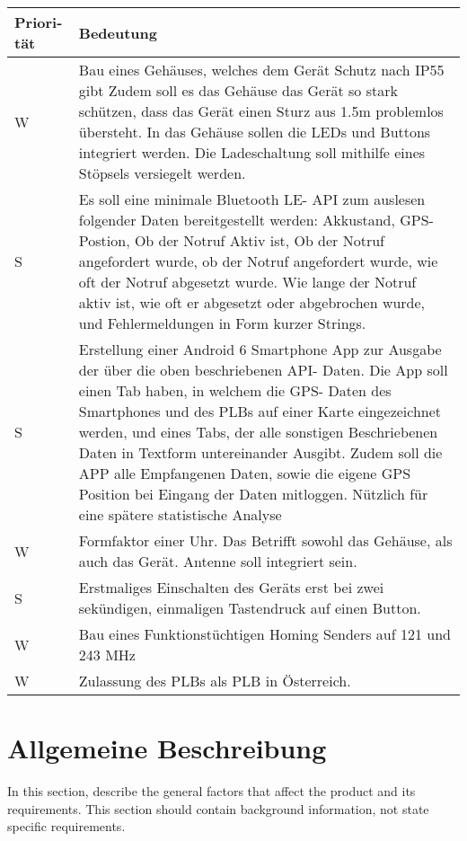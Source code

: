 \newpage
\begin{tabular}{| p{1.5cm} | p{13.5cm} |}
	
	\hline
	\textbf{Priori-} \newline \textbf{tät} & 
	\textbf{Bedeutung} \\
	\hline
	
	W & 
	Bau eines Gehäuses, welches dem Gerät Schutz nach IP55 gibt
	Zudem soll es das Gehäuse das Gerät so stark schützen, dass das Gerät einen Sturz aus 1.5m problemlos übersteht.
	In das Gehäuse sollen die LEDs und Buttons integriert werden. Die Ladeschaltung soll mithilfe eines Stöpsels versiegelt werden.\\
	\hline
	S &
	Es soll eine minimale Bluetooth LE- API zum auslesen folgender Daten bereitgestellt werden: Akkustand, GPS- Postion, Ob der Notruf Aktiv ist, Ob der Notruf angefordert wurde, ob der Notruf angefordert wurde, wie oft der Notruf abgesetzt wurde. Wie lange der Notruf aktiv ist, wie oft er abgesetzt oder abgebrochen wurde, und Fehlermeldungen in Form kurzer Strings.\\
	\hline
	S &
	Erstellung einer Android 6 Smartphone App zur Ausgabe der über die oben beschriebenen API- Daten. Die App soll einen Tab haben, in welchem die GPS- Daten des Smartphones und des PLBs auf einer Karte eingezeichnet werden, und eines Tabs, der alle sonstigen Beschriebenen Daten in Textform untereinander Ausgibt. Zudem soll die APP alle Empfangenen Daten, sowie die eigene GPS Position bei Eingang der Daten mitloggen. Nützlich für eine spätere statistische Analyse\\
	\hline
	
	W & 
	Formfaktor einer Uhr. Das Betrifft sowohl das Gehäuse, als auch das Gerät. Antenne soll integriert sein.\\
	\hline
	
	S &
	Erstmaliges Einschalten des Geräts erst bei zwei sekündigen, einmaligen Tastendruck auf einen Button.\\
	\hline
	
	W & 
	Bau eines Funktionstüchtigen Homing Senders auf 121 und 243 MHz\\
	\hline
	
	W & 
	Zulassung des PLBs als PLB in Österreich.\\
	\hline
	
\end{tabular}


\newpage

\section{Allgemeine Beschreibung}
In this section, describe the general factors that affect the product and its requirements. This section should contain background information, not state specific requirements.

